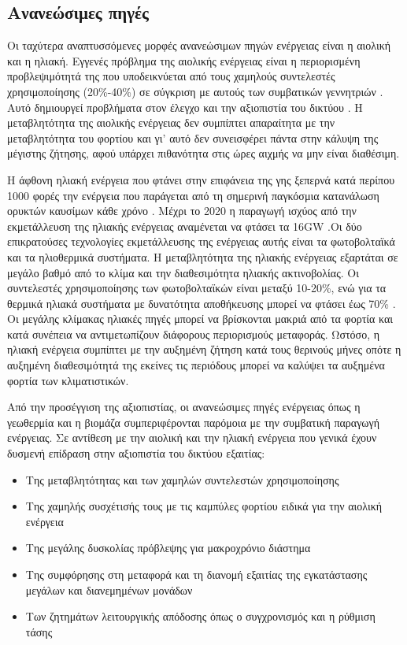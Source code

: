 \documentclass[12pt, a4paper, oneside]{report}
\begin{document}
\subsection{Ανανεώσιμες πηγές}

Οι ταχύτερα αναπτυσσόμενες μορφές ανανεώσιμων πηγών ενέργειας είναι η αιολική και η ηλιακή. Εγγενές πρόβλημα της αιολικής ενέργειας είναι η περιορισμένη προβλεψιμότητά της που υποδεικνύεται από τους χαμηλούς συντελεστές χρησιμοποίησης (20\%-40\%) σε σύγκριση με αυτούς των συμβατικών γεννητριών \cite{40}. Αυτό δημιουργεί προβλήματα στον έλεγχο και την αξιοπιστία του δικτύου \cite{41}. Η μεταβλητότητα της αιολικής ενέργειας δεν συμπίπτει απαραίτητα με την μεταβλητότητα του φορτίου και γι’ αυτό δεν συνεισφέρει πάντα στην κάλυψη της μέγιστης ζήτησης, αφού υπάρχει πιθανότητα στις ώρες αιχμής να μην είναι διαθέσιμη.

Η άφθονη ηλιακή ενέργεια που φτάνει στην επιφάνεια της γης ξεπερνά κατά περίπου 1000 φορές την ενέργεια που παράγεται από τη σημερινή παγκόσμια κατανάλωση ορυκτών καυσίμων κάθε χρόνο \cite{42}. Μέχρι το 2020 η παραγωγή ισχύος από την εκμετάλλευση της ηλιακής ενέργειας αναμένεται να φτάσει τα 16GW \cite{43}.Οι δύο επικρατούσες τεχνολογίες εκμετάλλευσης της ενέργειας αυτής είναι τα φωτοβολταϊκά και τα ηλιοθερμικά συστήματα. Η μεταβλητότητα της ηλιακής ενέργειας εξαρτάται σε μεγάλο βαθμό από το κλίμα και την διαθεσιμότητα ηλιακής ακτινοβολίας. Οι συντελεστές χρησιμοποίησης των φωτοβολταϊκών είναι μεταξύ 10-20\%, ενώ για τα θερμικά ηλιακά συστήματα με δυνατότητα αποθήκευσης μπορεί να φτάσει έως 70\% \cite{44}. Οι μεγάλης κλίμακας ηλιακές πηγές μπορεί να βρίσκονται μακριά από τα φορτία και κατά συνέπεια να αντιμετωπίζουν διάφορους περιορισμούς μεταφοράς. Ωστόσο, η ηλιακή ενέργεια συμπίπτει με την αυξημένη ζήτηση κατά τους θερινούς μήνες οπότε η αυξημένη διαθεσιμότητά της εκείνες τις περιόδους μπορεί να καλύψει τα αυξημένα φορτία των κλιματιστικών.

Από την προσέγγιση της αξιοπιστίας, οι ανανεώσιμες πηγές ενέργειας όπως η γεωθερμία και η βιομάζα συμπεριφέρονται παρόμοια με την συμβατική παραγωγή ενέργειας. Σε αντίθεση με την αιολική και την ηλιακή ενέργεια που γενικά έχουν δυσμενή επίδραση στην αξιοπιστία του δικτύου εξαιτίας:
\begin{itemize}
\item Της μεταβλητότητας και των χαμηλών συντελεστών χρησιμοποίησης
\item Της χαμηλής συσχέτισής τους με τις καμπύλες φορτίου ειδικά για την αιολική ενέργεια
\item Της μεγάλης δυσκολίας πρόβλεψης για μακροχρόνιο διάστημα
\item Της συμφόρησης στη μεταφορά και τη διανομή εξαιτίας της εγκατάστασης μεγάλων και διανεμημένων μονάδων
\item Των ζητημάτων λειτουργικής απόδοσης όπως ο συγχρονισμός και η ρύθμιση τάσης
\end{itemize}
\end{document}
